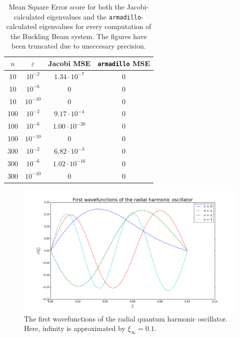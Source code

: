 \documentclass[reprint,english]{revtex4-1}
\begin{document}
\begin{table}[ht!]
\centering
\caption{Mean Square Error score for both the Jacobi-calculated eigenvalues and the \texttt{armadillo}-calculated eigenvalues for every computation of the Buckling Beam system. The figures have been truncated due to uneccesary precision.}\label{tab:bucklingbeam_MSE}
\begin{tabular}{|c|c|c|c|}
\hline
\(n\) & \(\varepsilon\) & Jacobi MSE             & \texttt{armadillo} MSE \\\hline
10    & \(10^{-2}\)     & \(1.34\cdot10^{-7}\)   & 0                      \\\hline
10    & \(10^{-6}\)     &  0                     & 0                      \\\hline
10    & \(10^{-10}\)    &  0                     & 0                      \\\hline
100   & \(10^{-2}\)     &  \(9.17\cdot10^{-4}\)  & 0                      \\\hline
100   & \(10^{-6}\)     &  \(1.00\cdot10^{-20}\) & 0                      \\\hline
100   & \(10^{-10}\)    &  0                     & 0                      \\\hline
300   & \(10^{-2}\)     &  \(6.82\cdot10^{-3}\)  & 0                      \\\hline
300   & \(10^{-6}\)     &  \(1.02\cdot10^{-16}\) & 0                      \\\hline
300   & \(10^{-10}\)    &  0                     & 0                      \\\hline
\end{tabular}
\end{table}
\newpage
\begin{figure}[ht]
\centering
\includegraphics[scale=0.25]{HarmonicOscillator/plots/wavefunction80_1.png}
\caption{The first wavefunctions of the radial quantum harmonic oscillator. Here, infinity is approximated by \(\xi_\infty=0.1\).}
\label{fig:harmonicoscillator_eigenvectors1}
\end{figure}
\end{document}
